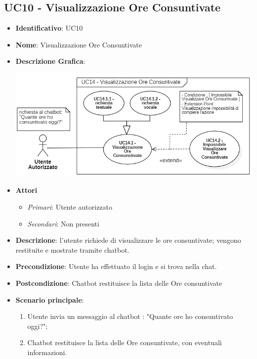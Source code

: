 \subsection{UC10 - Visualizzazione Ore Consuntivate }
\begin{itemize}
	\item \textbf{Identificativo}: UC10
	\item \textbf{Nome}: Visualizzazione Ore Consuntivate
	\item\textbf{Descrizione Grafica}: 
	\begin{center}
		\includegraphics[scale=0.65]{images/UC10.png} 
	\end{center}

	\item \textbf{Attori}
	\begin{itemize} 
		\item \textit{Primari}: Utente autorizzato
		\item \textit{Secondari}: Non presenti
	\end{itemize}
	\item \textbf{Descrizione}: l'utente richiede di visualizzare le ore consuntivate; vengono restituite e mostrate tramite chatbot.
	\item \textbf{Precondizione}: Utente ha effettuato il login e si trova nella chat.
	\item \textbf{Postcondizione}: Chatbot restituisce la lista delle Ore consuntivate
	\item \textbf{Scenario principale}:  
		\begin{enumerate}
			\item Utente invia un messaggio al chatbot : "Quante ore ho consuntivato oggi?";
			\item Chatbot restituisce la lista delle Ore consuntivate, con eventuali informazioni.
		\end{enumerate}
\end{itemize}

